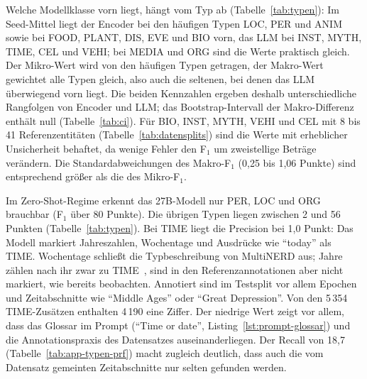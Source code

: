 Welche Modellklasse vorn liegt, hängt vom Typ ab
(Tabelle~\ref{tab:typen}): Im Seed-Mittel liegt der
Encoder bei den häufigen Typen LOC, PER und ANIM sowie bei FOOD, PLANT,
DIS, EVE und BIO vorn, das LLM bei INST, MYTH, TIME, CEL und VEHI; bei
MEDIA und ORG sind die Werte praktisch gleich.
Der Mikro-Wert wird von den häufigen Typen getragen, der Makro-Wert
gewichtet alle Typen gleich, also auch die seltenen, bei denen das LLM
überwiegend vorn liegt.
Die beiden Kennzahlen ergeben deshalb unterschiedliche Rangfolgen von
Encoder und LLM; das Bootstrap-Intervall der Makro-Differenz enthält null
(Tabelle~\ref{tab:ci}).
Für BIO, INST, MYTH, VEHI und CEL mit 8 bis 41 Referenzentitäten
(Tabelle~\ref{tab:datensplits}) sind die Werte mit erheblicher
Unsicherheit behaftet, da wenige
Fehler den F$_1$ um zweistellige Beträge verändern. Die
Standardabweichungen des Makro-F$_1$ (0,25 bis 1,06 Punkte) sind
entsprechend größer als die des Mikro-F$_1$.

Im Zero-Shot-Regime erkennt das 27B-Modell nur PER, LOC und ORG
brauchbar (F$_1$ über 80 Punkte). Die übrigen Typen liegen zwischen 2
und 56 Punkten (Tabelle~\ref{tab:typen}).
Bei TIME liegt die Precision bei 1,0 Punkt: Das Modell markiert
Jahreszahlen, Wochentage und Ausdrücke wie \enquote{today} als TIME.
Wochentage schließt die Typbeschreibung von MultiNERD aus; Jahre zählen
nach ihr zwar zu TIME~\cite[Tab.~1]{tedeschi2022multinerd}, sind in den
Referenzannotationen aber nicht markiert, wie bereits
\textcite{sainz2024gollie} beobachten. Annotiert sind im Testsplit vor
allem Epochen und Zeitabschnitte wie \enquote{Middle Ages} oder
\enquote{Great Depression}. Von den
5\,354 TIME-Zusätzen enthalten 4\,190 eine Ziffer.
Der niedrige Wert zeigt vor allem, dass das Glossar im Prompt
(\enquote{Time or date}, Listing~\ref{lst:prompt-glossar}) und die
Annotationspraxis des Datensatzes auseinanderliegen.
Der Recall von 18,7 (Tabelle~\ref{tab:app-typen-prf}) macht zugleich
deutlich,
dass auch die vom Datensatz gemeinten Zeitabschnitte nur selten gefunden
werden.

